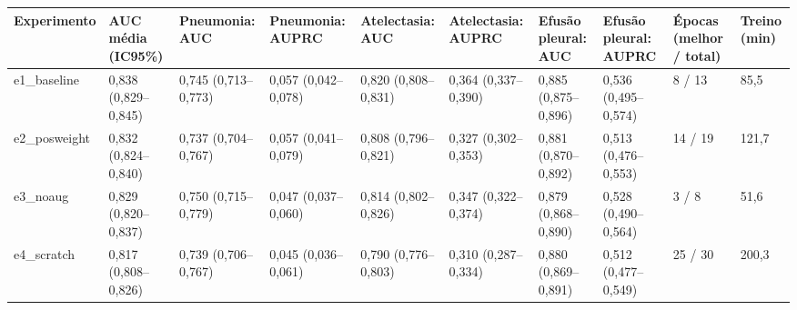 \begin{tabular}{llllllllll}
\toprule
Experimento & AUC média (IC95\%) & Pneumonia: AUC & Pneumonia: AUPRC & Atelectasia: AUC & Atelectasia: AUPRC & Efusão pleural: AUC & Efusão pleural: AUPRC & Épocas (melhor / total) & Treino (min) \\
\midrule
e1\_baseline & 0,838 (0,829–0,845) & 0,745 (0,713–0,773) & 0,057 (0,042–0,078) & 0,820 (0,808–0,831) & 0,364 (0,337–0,390) & 0,885 (0,875–0,896) & 0,536 (0,495–0,574) & 8 / 13 & 85,5 \\
e2\_posweight & 0,832 (0,824–0,840) & 0,737 (0,704–0,767) & 0,057 (0,041–0,079) & 0,808 (0,796–0,821) & 0,327 (0,302–0,353) & 0,881 (0,870–0,892) & 0,513 (0,476–0,553) & 14 / 19 & 121,7 \\
e3\_noaug & 0,829 (0,820–0,837) & 0,750 (0,715–0,779) & 0,047 (0,037–0,060) & 0,814 (0,802–0,826) & 0,347 (0,322–0,374) & 0,879 (0,868–0,890) & 0,528 (0,490–0,564) & 3 / 8 & 51,6 \\
e4\_scratch & 0,817 (0,808–0,826) & 0,739 (0,706–0,767) & 0,045 (0,036–0,061) & 0,790 (0,776–0,803) & 0,310 (0,287–0,334) & 0,880 (0,869–0,891) & 0,512 (0,477–0,549) & 25 / 30 & 200,3 \\
\bottomrule
\end{tabular}
